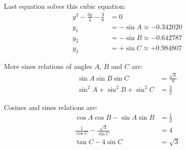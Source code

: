 \documentclass[11pt]{article}
\begin{document}
Last equation solves this cubic equation:
\begin{align*}
y^3 - \frac{3y}{4} - \frac{3}{8} &= 0\\
y_1 &= -\sin{A} \approx -0.342020\\
y_2 &= -\sin{B} \approx -0.642787\\
y_3 &= +\sin{C} \approx +0.984807
\end{align*}

More sines relations of angles $A$, $B$ and $C$ are:
\begin{align*}
\sin{A}\sin{B}\sin{C} &= \frac{\sqrt{3}}{8}\\
\sin^2{A} + \sin^2{B} + \sin^2{C} &= \frac{3}{2}
\end{align*}

Cosines and sines relations are:
\begin{align*}
\cos{A}\cos{B} - \sin{A}\sin{B} &= \frac{1}{2}\\
\frac{1}{\cos{C}} -\frac{\sqrt{3}}{\sin{C}} &= 4\\
\tan{C} - 4\sin{C} &= \sqrt{3}
\end{align*}
\end{document}
